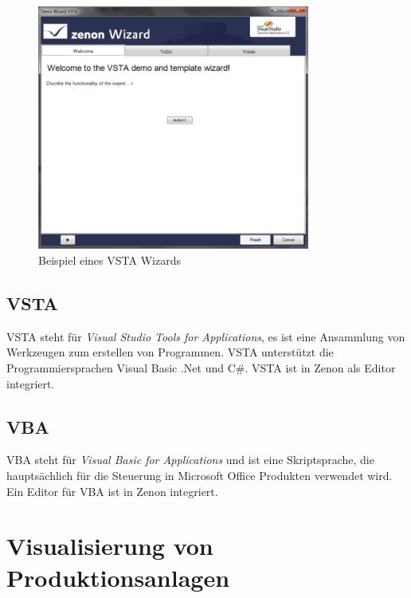 \begin{figure}[h!]
		\centering
		\includegraphics[width=0.8\textwidth]{graphics/stateoftheart/demowizard.png}
		\caption{Beispiel eines VSTA Wizards \cite{zenprog}}
\end{figure}

\subsection{VSTA}
VSTA steht für \textit{Visual Studio Tools for Applications}, es ist eine Ansammlung von Werkzeugen zum erstellen von Programmen. VSTA unterstützt die Programmiersprachen Visual Basic .Net und C\#.
VSTA ist in Zenon als Editor integriert.



\subsection{VBA}
VBA steht für \textit{Visual Basic for Applications} und ist eine Skriptsprache, die hauptsächlich für die Steuerung in Microsoft Office Produkten verwendet wird.
Ein Editor für VBA ist in Zenon integriert.



\section{Visualisierung von Produktionsanlagen}

